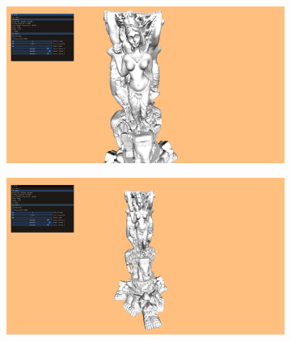 \begin{figure}[ht]
    \centering

    \begin{subfigure}{.45\textwidth}
        \includegraphics[width=\textwidth]{pics/impl-example-0.png}
    \end{subfigure}
    \begin{subfigure}{.45\textwidth}
        \includegraphics[width=\textwidth]{pics/impl-example-1.png}
    \end{subfigure}

    \medskip


\end{figure}
